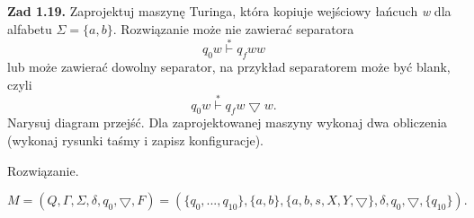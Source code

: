 \documentclass[12pt]{article}
\begin{document}
\newpage

\noindent\textbf{Zad 1.19.} Zaprojektuj maszynę Turinga, która kopiuje wejściowy łańcuch \textit{w} dla alfabetu $\Sigma=\{a,b\}$. Rozwiązanie może nie zawierać separatora
\[q_0w \overset{*}{\vdash} q_fww\]
lub  może  zawierać  dowolny  separator,  na  przykład  separatorem  może  być blank, czyli
\[q_0w \overset{*}{\vdash} q_fw \bigtriangledown w.\]
Narysuj diagram przejść. Dla zaprojektowanej maszyny wykonaj dwa obliczenia (wykonaj rysunki taśmy i zapisz konfiguracje).

 Rozwiązanie.
 
\[M=(Q,\Gamma,\Sigma,\delta,q_0,\bigtriangledown,F)=(\{q_0,...,q_{10}\},\{a,b\},\{a,b,s,X,Y,\bigtriangledown\},\delta,q_0,\bigtriangledown,\{q_{10}\}).\]

\begin{center}
\end{center}
\end{document}
